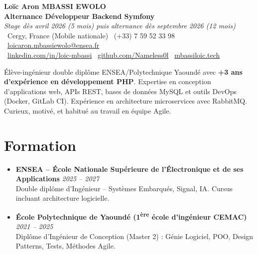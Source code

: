 \documentclass[a4paper,11pt]{article}
\begin{document}
\begin{center}
    {\Large \textbf{Loïc Aron MBASSI EWOLO}} \\ \vspace{4pt}
    \textbf{\large Alternance Développeur Backend Symfony} \\
    \textit{\small Stage dès avril 2026 (5 mois) puis alternance dès septembre 2026 (12 mois)} \\ \vspace{4pt}
    \small
    \faMapMarker\ Cergy, France (Mobile nationale) \quad
    \faPhone\ (+33) 7 59 52 33 98 \quad
    \faEnvelope\ {\color{primary}\href{mailto:loicaron.mbassiewolo@ensea.fr}{loicaron.mbassiewolo@ensea.fr}} \\ \vspace{2pt}
    {\color{primary}\faLinkedin\ \href{https://www.linkedin.com/in/loic-mbassi/}{linkedin.com/in/loic-mbassi}} \quad
    {\color{primary}\faGithub\ \href{https://github.com/Nameless0l}{github.com/Nameless0l}} \quad
    {\color{primary}\faGlobe\ \href{https://mbassiloic.tech}{mbassiloic.tech}}
\end{center}

\vspace{-6pt}

\noindent\small{Élève-ingénieur double diplôme ENSEA/Polytechnique Yaoundé avec \textbf{+3 ans d'expérience en développement PHP}. Expertise en conception d'applications web, APIs REST, bases de données MySQL et outils DevOps (Docker, GitLab CI). Expérience en architecture microservices avec RabbitMQ. Curieux, motivé, et habitué au travail en équipe Agile.}

\section{Formation}
\begin{itemize}[leftmargin=*, label=\tiny$\bullet$, nosep]
    \item \textbf{ENSEA -- École Nationale Supérieure de l'Électronique et de ses Applications} \hfill \textit{2025 -- 2027} \\
    \small{Double diplôme d'Ingénieur -- Systèmes Embarqués, Signal, IA. Cursus incluant architecture logicielle.}
    \item \textbf{École Polytechnique de Yaoundé (1\textsuperscript{ère} école d'ingénieur CEMAC)} \hfill \textit{2021 -- 2025} \\
    \small{Diplôme d'Ingénieur de Conception (Master 2) : Génie Logiciel, POO, Design Patterns, Tests, Méthodes Agile.}
\end{itemize}
\end{document}
